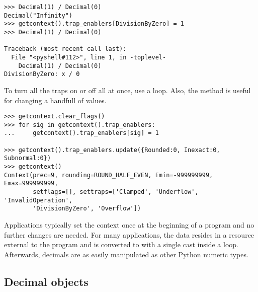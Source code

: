 \begin{verbatim}
>>> Decimal(1) / Decimal(0)
Decimal("Infinity")
>>> getcontext().trap_enablers[DivisionByZero] = 1
>>> Decimal(1) / Decimal(0)

Traceback (most recent call last):
  File "<pyshell#112>", line 1, in -toplevel-
    Decimal(1) / Decimal(0)
DivisionByZero: x / 0
\end{verbatim}

To turn all the traps on or off all at once, use a loop.  Also, the
 method is useful for changing a handfull of values.

\begin{verbatim}
>>> getcontext.clear_flags()
>>> for sig in getcontext().trap_enablers:
...     getcontext().trap_enablers[sig] = 1

>>> getcontext().trap_enablers.update({Rounded:0, Inexact:0, Subnormal:0})
>>> getcontext()
Context(prec=9, rounding=ROUND_HALF_EVEN, Emin=-999999999, Emax=999999999,
        setflags=[], settraps=['Clamped', 'Underflow', 'InvalidOperation',
        'DivisionByZero', 'Overflow'])
\end{verbatim}

Applications typically set the context once at the beginning of a program
and no further changes are needed.  For many applications, the data resides
in a resource external to the program and is converted to  with
a single cast inside a loop.  Afterwards, decimals are as easily manipulated
as other Python numeric types.



\subsection{Decimal objects \label{decimal-decimal}}

